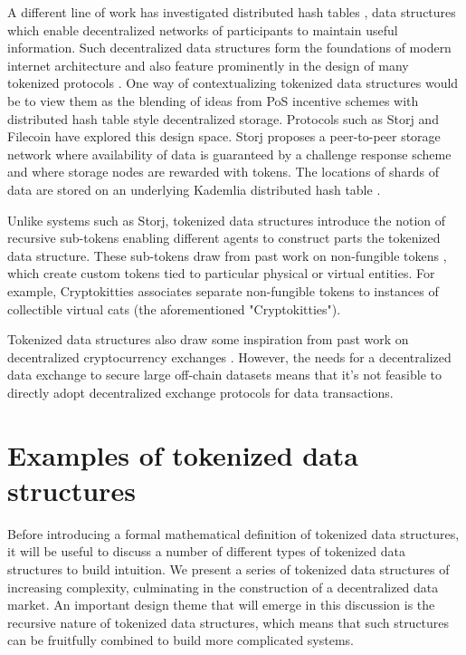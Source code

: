 \documentclass{llncs}
\begin{document}
A different line of work has investigated distributed hash tables \cite{stoica2003chord, kaashoek2003koorde, maymounkov2002kademlia}, data structures which enable decentralized networks of participants to maintain useful information. Such decentralized data structures form the foundations of modern internet architecture and also feature prominently in the design of many tokenized protocols \cite{wood2014ethereum, wilkinson2014storj}. One way of contextualizing tokenized data structures would be to view them as the blending of ideas from PoS incentive schemes with distributed hash table style decentralized storage. Protocols such as Storj \cite{wilkinson2014storj} and Filecoin \cite{filecoin2017} have explored this design space. Storj proposes a peer-to-peer storage network where availability of data is guaranteed by a challenge response scheme and where storage nodes are rewarded with tokens. The locations of shards of data are stored on an underlying Kademlia distributed hash table \cite{maymounkov2002kademlia}.

Unlike systems such as Storj, tokenized data structures introduce the notion of recursive sub-tokens enabling different agents to construct parts the tokenized data structure. These sub-tokens draw from past work on non-fungible tokens \cite{eip721}, which create custom tokens tied to particular physical or virtual entities. For example, Cryptokitties \cite{cryptokitties2018} associates separate non-fungible tokens to instances of collectible virtual cats (the aforementioned "Cryptokitties").

Tokenized data structures also draw some inspiration from past work on decentralized cryptocurrency exchanges \cite{warren20170x}. However, the needs for a decentralized data exchange to secure large off-chain datasets means that it's not feasible to directly adopt decentralized exchange protocols for data transactions.


\section{Examples of tokenized data structures}

Before introducing a formal mathematical definition of tokenized data structures, it will be useful to discuss a number of different types of tokenized data structures to build intuition. We present a series of tokenized data structures of increasing complexity, culminating in the construction of a decentralized data market. An important design theme that will emerge in this discussion is the recursive nature of tokenized data structures, which means that such structures can be fruitfully combined to build more complicated systems.
\end{document}
